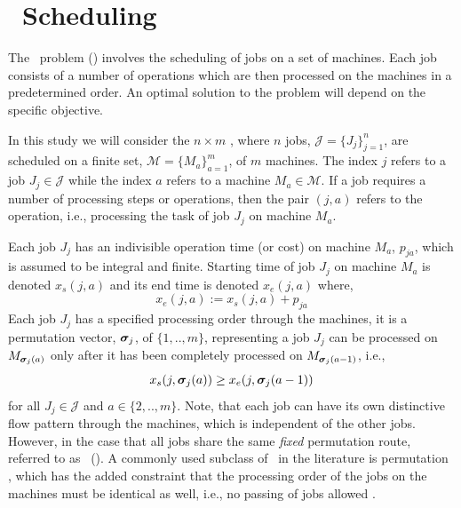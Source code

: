 \documentclass[smallextended]{svjour3}
\begin{document}

\section{\Jsp~Scheduling}\label{sec:problemdef}
The \jsp~problem (\JSP) involves the scheduling of jobs on a set of 
machines. Each job consists of a number of operations which are then processed 
on the machines in a predetermined order. An optimal solution to the problem 
will depend on the specific objective. 

In this study we will consider the $n\times m$ \JSP, where $n$ jobs, 
$\mathcal{J}=\{J_j\}_{j=1}^n$, are scheduled on a finite set, 
$\mathcal{M}=\{M_a\}_{a=1}^m$, of $m$ machines. The index $j$ refers to a job 
$J_j\in\mathcal{J}$ while the index  $a$ refers to a machine 
$M_a\in\mathcal{M}$. 
If a job requires a number of processing steps or operations, then the pair 
$(j,a)$ refers to the operation, i.e., processing the task of job $J_j$ on 
machine $M_a$. 

Each job $J_j$ has an indivisible operation time (or cost) on machine $M_a$, 
$p_{ja}$, which is assumed to be integral and finite. 
Starting time of job $J_j$ on machine $M_a$ is denoted $x_s(j,a)$ and its 
end time is denoted $x_e(j,a)$ where, 
\begin{equation}  x_e(j,a):=x_s(j,a)+p_{ja} \end{equation} 
Each job $J_j$ has a specified processing order through the machines, it is a 
permutation vector, $\bm \sigma_j$, of $\{1,..,m\}$, representing a job $J_j$ can 
be processed on $M_{\bm \sigma_j(a)}$ only after it has been completely processed 
on $M_{\bm \sigma_j(a-1)}$, i.e.,
\begin{equation}\label{eq:permutation}
x_s(j,\bm \sigma_j(a)) \geq x_e(j,\bm \sigma_j(a-1)) 
\end{equation}
for all $J_j\in\mathcal{J}$ and $a\in\{2,..,m\}$. 
Note, that each job can have its own distinctive flow pattern through the 
machines, which is independent of the other jobs. 
However, in the case that all jobs share the same \emph{fixed} permutation 
route, referred to as \fsp~(\FSP). 
A commonly used subclass of \FSP\ in the literature is permutation \fsp, which 
has the added constraint that the processing order of the jobs on the machines 
must be identical as well, i.e., no passing of jobs allowed \cite{Stafford88}.
\end{document}
